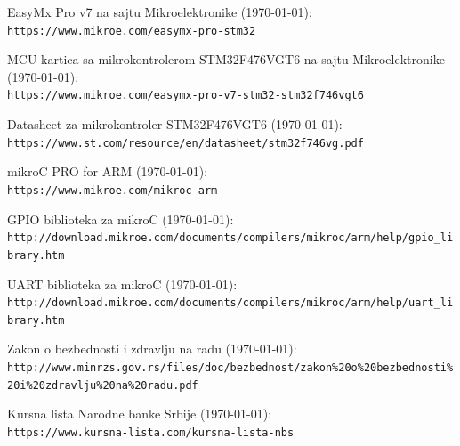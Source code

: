 \documentclass[a4paper, 12pt, oneside, titlepage]{article}
\begin{document}
    
    \clearpage
    \begin{thebibliography}{4}
        EasyMx Pro v7 na sajtu Mikroelektronike (\today):\\
	\lstinline|https://www.mikroe.com/easymx-pro-stm32|
        
        MCU kartica sa mikrokontrolerom STM32F476VGT6 na sajtu Mikroelektronike (\today):\\
	\lstinline|https://www.mikroe.com/easymx-pro-v7-stm32-stm32f746vgt6|
	
	Datasheet za mikrokontroler STM32F476VGT6 (\today):\\
	\lstinline|https://www.st.com/resource/en/datasheet/stm32f746vg.pdf|
	
	mikroC PRO for ARM (\today):\\
	\lstinline|https://www.mikroe.com/mikroc-arm|
	
	GPIO biblioteka za mikroC (\today):\\
	\lstinline|http://download.mikroe.com/documents/compilers/mikroc/arm/help/gpio_library.htm|
	
	UART biblioteka za mikroC (\today):\\
	\lstinline|http://download.mikroe.com/documents/compilers/mikroc/arm/help/uart_library.htm|
	
	Zakon o bezbednosti i zdravlju na radu (\today):\\
	\lstinline|http://www.minrzs.gov.rs/files/doc/bezbednost/zakon%20o%20bezbednosti%20i%20zdravlju%20na%20radu.pdf|
        
	Kursna lista Narodne banke Srbije (\today):\\
	\lstinline|https://www.kursna-lista.com/kursna-lista-nbs|
    \end{thebibliography}
    \clearpage
    
    

    
    
\end{document}
